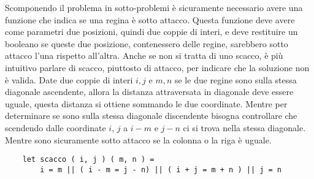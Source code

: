 \documentclass{article}
\numberwithin{equation}{subsection}
\begin{document}
Scomponendo il problema in sotto-problemi è sicuramente necessario avere una funzione che indica se una regina è sotto attacco. Questa funzione deve avere come parametri due posizioni, quindi due coppie di interi, e deve restituire un booleano se queste due posizione, contenessero delle regine, sarebbero sotto attacco l'una rispetto all'altra. Anche se non si tratta di uno scacco, è più intuitivo parlare di scacco, piuttosto di attacco, per indicare che la soluzione non è valida. 
Date due coppie di interi $i,j$ e $m,n$ se le due regine sono sulla stessa diagonale ascendente, allora la distanza attraversata in diagonale deve essere uguale, questa distanza si ottiene sommando le due coordinate. Mentre per determinare se sono sulla stessa diagonale discendente bisogna controllare che scendendo dalle coordinate $i$, $j$ a $i-m$ e $j-n$ ci si trova nella stessa diagonale. 
Mentre sono sicuramente sotto attacco se la colonna o la riga è uguale. 
\begin{verbatim}
    let scacco ( i, j ) ( m, n ) =
        i = m || ( i - m = j - n) || ( i + j = m + n ) || j = n
\end{verbatim}
\end{document}
